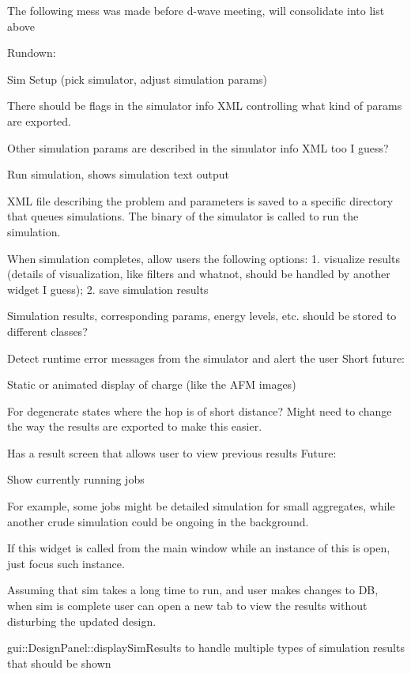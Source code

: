 The following mess was made before d-\/wave meeting, will consolidate into list above
\begin{DoxyItemize}
\item Rundown\+:
\begin{DoxyItemize}
\item Sim Setup (pick simulator, adjust simulation params)
\begin{DoxyItemize}
\item There should be flags in the simulator info X\+ML controlling what kind of params are exported.
\item Other simulation params are described in the simulator info X\+ML too I guess?
\end{DoxyItemize}
\item Run simulation, shows simulation text output
\begin{DoxyItemize}
\item X\+ML file describing the problem and parameters is saved to a specific directory that queues simulations. The binary of the simulator is called to run the simulation.
\end{DoxyItemize}
\item When simulation completes, allow users the following options\+: 1. visualize results (details of visualization, like filters and whatnot, should be handled by another widget I guess); 2. save simulation results
\begin{DoxyItemize}
\item Simulation results, corresponding params, energy levels, etc. should be stored to different classes?
\end{DoxyItemize}
\end{DoxyItemize}
\item Detect runtime error messages from the simulator and alert the user Short future\+:
\item Static or animated display of charge (like the A\+FM images)
\begin{DoxyItemize}
\item For degenerate states where the hop is of short distance? Might need to change the way the results are exported to make this easier.
\end{DoxyItemize}
\item Has a result screen that allows user to view previous results Future\+:
\item Show currently running jobs
\item For example, some jobs might be detailed simulation for small aggregates, while another crude simulation could be ongoing in the background.
\item If this widget is called from the main window while an instance of this is open, just focus such instance.
\item Assuming that sim takes a long time to run, and user makes changes to DB, when sim is complete user can open a new tab to view the results without disturbing the updated design.
\item gui\+::\+Design\+Panel\+::display\+Sim\+Results to handle multiple types of simulation results that should be shown
\end{DoxyItemize}

